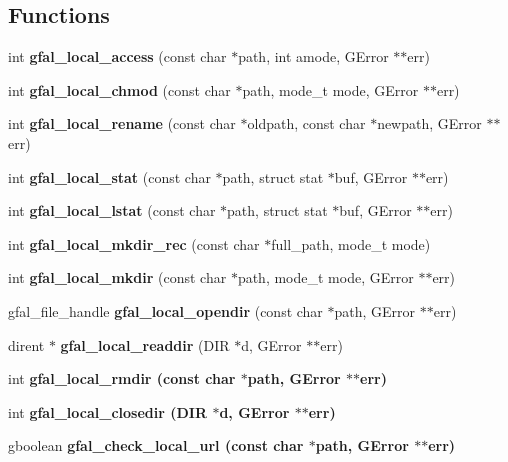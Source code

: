\subsection*{Functions}
\begin{CompactItemize}
\item 
int \textbf{gfal\_\-local\_\-access} (const char $\ast$path, int amode, GError $\ast$$\ast$err)\label{gfal__posix__local__file_8c_a98ca73fb3083a78f5d85b1f298a8b97}

\item 
int \textbf{gfal\_\-local\_\-chmod} (const char $\ast$path, mode\_\-t mode, GError $\ast$$\ast$err)\label{gfal__posix__local__file_8c_d6c6d5590083bbcef4833f8186a629f3}

\item 
int \textbf{gfal\_\-local\_\-rename} (const char $\ast$oldpath, const char $\ast$newpath, GError $\ast$$\ast$err)\label{gfal__posix__local__file_8c_360b4701633deaae52f9f77c94173405}

\item 
int \textbf{gfal\_\-local\_\-stat} (const char $\ast$path, struct stat $\ast$buf, GError $\ast$$\ast$err)\label{gfal__posix__local__file_8c_dc96268400be1d41613ab796237c1cb8}

\item 
int \textbf{gfal\_\-local\_\-lstat} (const char $\ast$path, struct stat $\ast$buf, GError $\ast$$\ast$err)\label{gfal__posix__local__file_8c_5ad87b117d838e861e51a0999307cc71}

\item 
int \textbf{gfal\_\-local\_\-mkdir\_\-rec} (const char $\ast$full\_\-path, mode\_\-t mode)\label{gfal__posix__local__file_8c_4cb0dd1292a24921b9f693a836dc5771}

\item 
int \textbf{gfal\_\-local\_\-mkdir} (const char $\ast$path, mode\_\-t mode, GError $\ast$$\ast$err)\label{gfal__posix__local__file_8c_29c13ce3294eab970124d188fab1c567}

\item 
gfal\_\-file\_\-handle \textbf{gfal\_\-local\_\-opendir} (const char $\ast$path, GError $\ast$$\ast$err)\label{gfal__posix__local__file_8c_56dc809549c9ff1f7f245619fae1dea5}

\item 
dirent $\ast$ \textbf{gfal\_\-local\_\-readdir} (DIR $\ast$d, GError $\ast$$\ast$err)\label{gfal__posix__local__file_8c_154d6466ff14a02bd004a735823963fe}

\item 
int \bf{gfal\_\-local\_\-rmdir} (const char $\ast$path, GError $\ast$$\ast$err)
\item 
int \bf{gfal\_\-local\_\-closedir} (DIR $\ast$d, GError $\ast$$\ast$err)
\item 
gboolean \bf{gfal\_\-check\_\-local\_\-url} (const char $\ast$path, GError $\ast$$\ast$err)
\end{CompactItemize}


